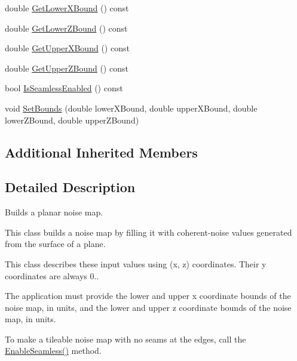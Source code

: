 \begin{DoxyCompactItemize}
\item 
double \hyperlink{classnoise_1_1utils_1_1_noise_map_builder_plane_a7fcdf629f25bf97dc105bd218e04e2f7}{Get\+Lower\+X\+Bound} () const 
\item 
double \hyperlink{classnoise_1_1utils_1_1_noise_map_builder_plane_accdd95d5332d919e2420ec0b6b74de3c}{Get\+Lower\+Z\+Bound} () const 
\item 
double \hyperlink{classnoise_1_1utils_1_1_noise_map_builder_plane_a676f8ad0d645990b95faa18052afd380}{Get\+Upper\+X\+Bound} () const 
\item 
double \hyperlink{classnoise_1_1utils_1_1_noise_map_builder_plane_a57893a6512748aec267e9c186d30f925}{Get\+Upper\+Z\+Bound} () const 
\item 
bool \hyperlink{classnoise_1_1utils_1_1_noise_map_builder_plane_a2ed067659249fa28e4220166cb221ce7}{Is\+Seamless\+Enabled} () const 
\item 
void \hyperlink{classnoise_1_1utils_1_1_noise_map_builder_plane_a64bae7af3e301fafe7fe887b26029d98}{Set\+Bounds} (double lower\+X\+Bound, double upper\+X\+Bound, double lower\+Z\+Bound, double upper\+Z\+Bound)
\end{DoxyCompactItemize}
\subsection*{Additional Inherited Members}


\subsection{Detailed Description}
Builds a planar noise map.

This class builds a noise map by filling it with coherent-\/noise values generated from the surface of a plane.

This class describes these input values using (x, z) coordinates. Their y coordinates are always 0..

The application must provide the lower and upper x coordinate bounds of the noise map, in units, and the lower and upper z coordinate bounds of the noise map, in units.

To make a tileable noise map with no seams at the edges, call the \hyperlink{classnoise_1_1utils_1_1_noise_map_builder_plane_aaeb5753c662ab9357ac124e06be31b22}{Enable\+Seamless()} method. 

